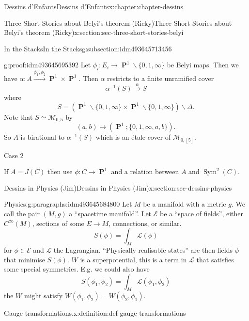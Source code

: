 \documentclass[oneside,10pt,]{book}
\numberwithin{equation}{section}
\newcommand{\cinf}{C^\infty}
\newcommand{\inv}{^{-1}}
\newcommand{\lb}{[}
\newcommand{\rb}{]}
\DeclareMathOperator{\PP}{\mathbf{P}}
\DeclareMathOperator{\Sym}{Sym}
\begin{document}
\begin{chapterptx}{Dessins d'Enfants}{}{Dessins d'Enfants}{}{}{x:chapter:chapter-dessins}
\begin{sectionptx}{Three Short Stories about Belyi's theorem (Ricky)}{}{Three Short Stories about Belyi's theorem (Ricky)}{}{}{x:section:sec-three-short-stories-belyi}
\begin{subsectionptx}{In the Stacks}{}{In the Stacks}{}{}{g:subsection:idm493645713456}
\begin{proofptx}{}{g:proof:idm493645695392}
Let \(\phi_i \colon E_i \to \PP^1\smallsetminus \{0,1,\infty\}\) be Belyi maps. Then we have \(\alpha \colon A \xrightarrow{\phi_1,\phi_2} \PP^1 \times \PP^1\). Then \(\alpha\) restricts to a finite unramified cover%
\begin{equation*}
\alpha\inv (S) \xrightarrow \alpha S
\end{equation*}
where%
\begin{equation*}
S = (\PP^1 \smallsetminus \{0,1,\infty\} \times \PP^1 \smallsetminus \{0,1,\infty\}) \smallsetminus \Delta\text{.}
\end{equation*}
Note that \(S \simeq \mathcal M_{0,5}\) by%
\begin{equation*}
(a,b ) \mapsto (\PP^1; \{0,1,\infty, a,b\})\text{.}
\end{equation*}
So \(A\) is birational to \(\alpha\inv (S)\) which is an étale cover of \(\mathcal M_{0,\lb 5 \rb}\).%
\par
Case 2%
\par
If \(A = J(C)\) then use \(\phi \colon C \to \PP^1\) and a relation between \(A\) and \(\Sym^2(C)\).%
\end{proofptx}
\end{subsectionptx}
\end{sectionptx}
%
%
\typeout{************************************************}
\typeout{************************************************}
%
\begin{sectionptx}{Dessins in Physics (Jim)}{}{Dessins in Physics (Jim)}{}{}{x:section:sec-dessins-physics}
\begin{paragraphs}{Physics.}{g:paragraphs:idm493645684800}%
Let  \(M\)  be a manifold with  a metric \(g\). We call the pair \((M,g)\) a ``spacetime manifold''. Let \(\mathcal E\) be  a ``space of fields'', either \(\cinf (M)\), sections of some \(E\to M\), connections, or similar.%
\begin{equation*}
S(\phi) = \int_M \mathcal    L (\phi)
\end{equation*}
for \(\phi\in \mathcal E\) and \(\mathcal L\) the Lagrangian. ``Physically realisable states'' are then fields \(\phi\) that minimise \(S(\phi)\). \(W\) is a superpotential, this is a term in \(\mathcal L\) that satisfies some special symmetries. E.g. we could also have%
\begin{equation*}
S(\phi_1, \phi_2) = \int_M \mathcal L(\phi_1,\phi_2)
\end{equation*}
the \(W\) might satisfy \(W(\phi_1, \phi_2) = W(\phi_2, \phi_1)\).%
\begin{definition}{Gauge transformations.}{x:definition:def-gauge-transformations}%

\end{definition}
\end{paragraphs}
\end{sectionptx}
\end{chapterptx}
\end{document}
